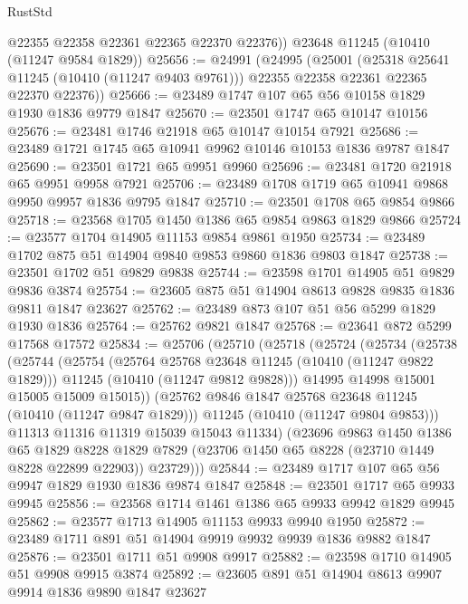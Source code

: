 \begin{lexlean}{RustStd}
\begin{coremodule}
        @22355
        @22358
        @22361
        @22365
        @22370
        @22376))
    @23648
    @11245
    (@10410 (@11247 @9584 @1829))
@25656 := @24991
    (@24995
      (@25001
        (@25318 @25641 @11245 (@10410 (@11247 @9403 @9761)))
        @22355
        @22358
        @22361
        @22365
        @22370
        @22376))
@25666 := @23489 @1747 @107 @65 @56 @10158 @1829 @1930 @1836 @9779 @1847
@25670 := @23501 @1747 @65 @10147 @10156
@25676 := @23481 @1746 @21918 @65 @10147 @10154 @7921
@25686 := @23489 @1721 @1745 @65 @10941 @9962 @10146 @10153 @1836 @9787 @1847
@25690 := @23501 @1721 @65 @9951 @9960
@25696 := @23481 @1720 @21918 @65 @9951 @9958 @7921
@25706 := @23489 @1708 @1719 @65 @10941 @9868 @9950 @9957 @1836 @9795 @1847
@25710 := @23501 @1708 @65 @9854 @9866
@25718 := @23568 @1705 @1450 @1386 @65 @9854 @9863 @1829 @9866
@25724 := @23577 @1704 @14905 @11153 @9854 @9861 @1950
@25734 := @23489 @1702 @875 @51 @14904 @9840 @9853 @9860 @1836 @9803 @1847
@25738 := @23501 @1702 @51 @9829 @9838
@25744 := @23598 @1701 @14905 @51 @9829 @9836 @3874
@25754 := @23605 @875 @51 @14904 @8613 @9828 @9835 @1836 @9811 @1847 @23627
@25762 := @23489 @873 @107 @51 @56 @5299 @1829 @1930 @1836
@25764 := @25762 @9821 @1847
@25768 := @23641 @872 @5299 @17568 @17572
@25834 := @25706
    (@25710
      (@25718
        (@25724
          (@25734
            (@25738
              (@25744
                (@25754
                  (@25764 @25768 @23648 @11245 (@10410 (@11247 @9822 @1829)))
                  @11245
                  (@10410 (@11247 @9812 @9828)))
                @14995
                @14998
                @15001
                @15005
                @15009
                @15015))
            (@25762 @9846 @1847 @25768 @23648 @11245 (@10410 (@11247 @9847 @1829)))
            @11245
            (@10410 (@11247 @9804 @9853)))
          @11313
          @11316
          @11319
          @15039
          @15043
          @11334)
        (@23696
          @9863
          @1450
          @1386
          @65
          @1829
          @8228
          @1829
          @7829
          (@23706 @1450 @65 @8228 (@23710 @1449 @8228 @22899 @22903))
          @23729)))
@25844 := @23489 @1717 @107 @65 @56 @9947 @1829 @1930 @1836 @9874 @1847
@25848 := @23501 @1717 @65 @9933 @9945
@25856 := @23568 @1714 @1461 @1386 @65 @9933 @9942 @1829 @9945
@25862 := @23577 @1713 @14905 @11153 @9933 @9940 @1950
@25872 := @23489 @1711 @891 @51 @14904 @9919 @9932 @9939 @1836 @9882 @1847
@25876 := @23501 @1711 @51 @9908 @9917
@25882 := @23598 @1710 @14905 @51 @9908 @9915 @3874
@25892 := @23605 @891 @51 @14904 @8613 @9907 @9914 @1836 @9890 @1847 @23627

\end{coremodule}
\end{lexlean}
